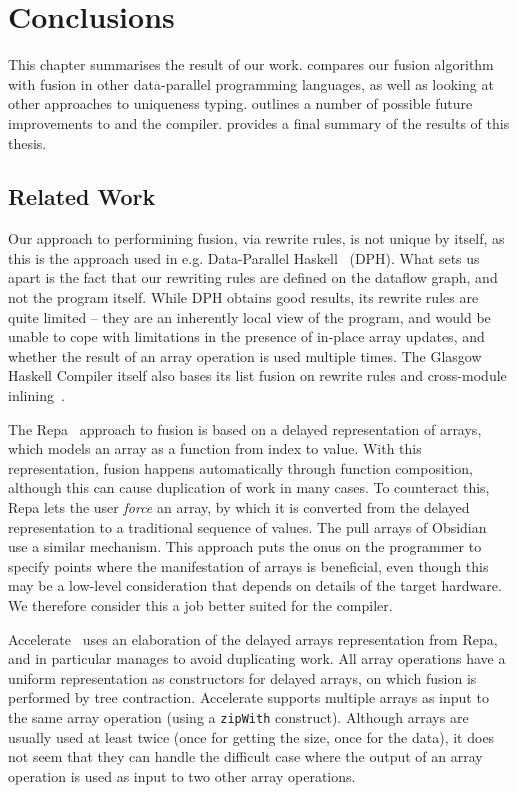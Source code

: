 \chapter{Conclusions}
\label{chap:conclusions}

This chapter summarises the result of our work.
 compares our fusion algorithm with fusion in
other data-parallel programming languages, as well as looking at other
approaches to uniqueness typing.   outlines a
number of possible future improvements to \LO{} and the compiler.
 provides a final summary of the results of this
thesis.

\section{Related Work}
\label{sec:related-work}

Our approach to performining fusion, via rewrite rules, is not unique
by itself, as this is the approach used in e.g. Data-Parallel
Haskell~\cite{Chak06DPH} (DPH).  What sets us apart is the fact that
our rewriting rules are defined on the dataflow graph, and not the
program itself.  While DPH obtains good results, its rewrite rules are
quite limited -- they are an inherently local view of the program, and
would be unable to cope with limitations in the presence of in-place
array updates, and whether the result of an array operation is used
multiple times.  The Glasgow Haskell Compiler itself also bases its
list fusion on rewrite rules and cross-module
inlining~\cite{jones2001playing,gill1993short}.

The Repa~\cite{keller2010regular} approach to fusion is based on a
delayed representation of arrays, which models an array as a function
from index to value.  With this representation, fusion happens
automatically through function composition, although this can cause
duplication of work in many cases.  To counteract this, Repa lets the
user \textit{force} an array, by which it is converted from the
delayed representation to a traditional sequence of values.  The pull
arrays of Obsidian~\cite{claessen2012expressive} use a similar
mechanism.  This approach puts the onus on the programmer to specify
points where the manifestation of arrays is beneficial, even though
this may be a low-level consideration that depends on details of the
target hardware.  We therefore consider this a job better suited for
the compiler.

Accelerate~\cite{mcdonell2013optimising} uses an elaboration of the
delayed arrays representation from Repa, and in particular manages to
avoid duplicating work.  All array operations have a uniform
representation as constructors for delayed arrays, on which fusion is
performed by tree contraction.  Accelerate supports multiple arrays as
input to the same array operation (using a \texttt{zipWith}
construct).  Although arrays are usually used at least twice (once for
getting the size, once for the data), it does not seem that they can
handle the difficult case where the output of an array operation is
used as input to two other array operations.

